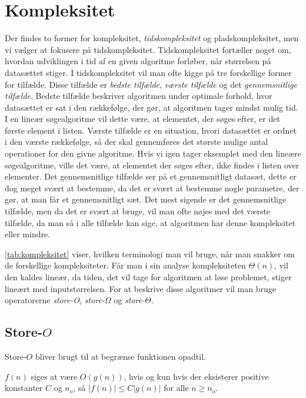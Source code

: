 \section{Kompleksitet} \label{kap:kompleksitet}

Der findes to former for kompleksitet, \emph{tidskompleksitet} og pladskompleksitet, men vi vælger at fokusere på tidskompleksitet. 
Tidskompleksitet fortæller noget om, hvordan udviklingen i tid af en given algoritme forløber, når størrelsen på datasættet stiger. I tidskompleksitet vil man ofte kigge på tre forskellige former for tilfælde. Disse tilfælde er \emph{bedste tilfælde}, \emph{værste tilfælde} og det \emph{gennemsnitlige tilfælde}. 
Bedste tilfælde beskriver algoritmen under optimale forhold, hvor datasættet er sat i den rækkefølge, der gør, at algoritmen tager mindst mulig tid. I en lineær søgealgoritme vil dette være, at elementet, der søges efter, er det første element i listen. 
Værste tilfælde er en situation, hvori datasættet er ordnet i den værste rækkefølge, så der skal gennemføres det største mulige antal operationer for den givne algoritme. Hvis vi igen tager eksemplet med den lineære søgealgoritme, ville det være, at elementet der søges efter, ikke findes i listen over elementer.
Det gennemsnitlige tilfælde ser på et gennemsnitligt datasæt, dette er dog meget svært at bestemme, da det er svært at bestemme nogle parametre, der gør, at man får et gennemsnitligt sæt.
Det mest sigende er det gennemsnitlige tilfælde, men da det er svært at bruge, vil man ofte nøjes med det værste tilfælde, da man så i alle tilfælde kan sige, at algoritmen har denne kompleksitet eller mindre.





\autoref{tab:kompleksitet} viser, hvilken terminologi man vil bruge, når man snakker om de forskellige kompleksiteter. Får man i sin analyse kompleksiteten $\Theta(n)$, vil den kaldes lineær, da tiden, det vil tage for algoritmen at løse problemet, stiger lineært med inputstørrelsen.
For at beskrive disse algoritmer vil man bruge operatorerne \emph{store-O}, \emph{store-$\Omega$} og \emph{store-$\Theta$}. 
\subsection{Store-$O$}
Store-$O$ bliver brugt til at begrænse funktionen opadtil. 

\begin{defn}
$f(n)$ siges at være $O(g(n))$, hvis og kun hvis der eksisterer positive konstanter $C$ og $n_o$, så $|f(n)| \leq C |g(n)|$ for alle $n \geq n_o$.
\end{defn}

